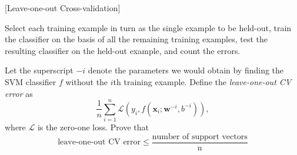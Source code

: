 \item {} [Leave-one-out Cross-validation]

Select each training example in turn as the single example to be held-out, train the classifier on the basis of all the remaining training examples, test the resulting classifier on the held-out example, and count the errors.

Let the superscript $-i$ denote the parameters we would obtain by finding the SVM classifier $f$ without the $i$th training example. Define the \textit{leave-one-out CV error} as
\begin{equation}
    \frac{1}{n}\sum_{i=1}^n\mathcal{L}(y_i,f(\mathbf{x}_i;\mathbf{w}^{-i},b^{-i})),
\end{equation}
where $\mathcal{L}$ is the zero-one loss. Prove that
\begin{equation}
    \text{leave-one-out CV error}\leq \frac{\text{number of support vectors}}{\text{n}}
\end{equation}

\solution


